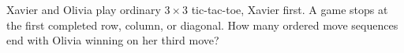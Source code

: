 Xavier and Olivia play ordinary $3\times3$ tic-tac-toe, Xavier first. A game stops at the first completed row, column, or diagonal. How many ordered move sequences end with Olivia winning on her third move?
